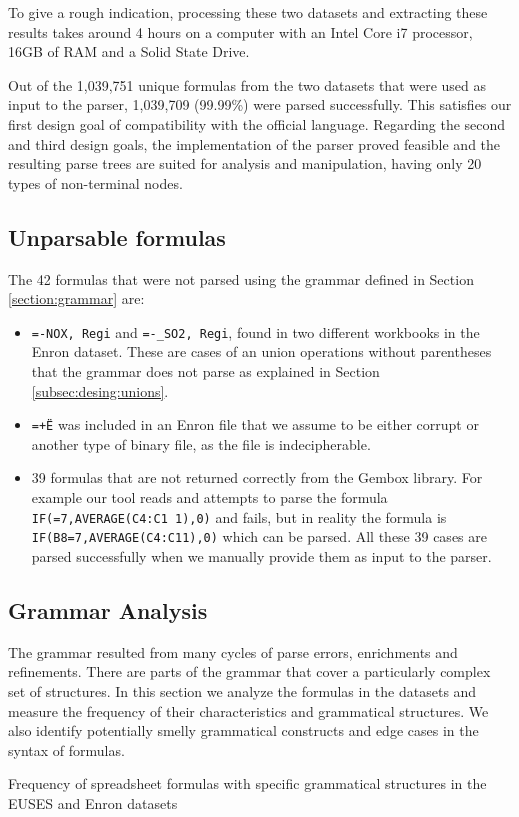 \documentclass[conference]{IEEEtran}
\begin{document}
To give a rough indication, processing these two datasets and extracting these results takes around 4 hours on a computer with an Intel Core i7 processor, 16GB of RAM and a Solid State Drive.

Out of the 1,039,751 unique formulas from the two datasets that were used as input to the parser, 1,039,709 (99.99\%) were parsed successfully. This satisfies our first design goal of compatibility with the official language. Regarding the second and third design goals, the implementation of the parser proved feasible and the resulting parse trees are suited for analysis and manipulation, having only 20 types of non-terminal nodes.

\subsection{Unparsable formulas}
\label{subsection:unparsableFormulas}
The 42 formulas that were not parsed using the grammar defined in Section \ref{section:grammar} are:

\begin{itemize}
	\item \texttt{=-NOX, Regi} and \texttt{=-_SO2, Regi}, found in two different workbooks in the Enron dataset. These are cases of an union operations without parentheses that the grammar does not parse as explained in Section \ref{subsec:desing:unions}.
	\item \texttt{=+Ë\textperthousand} was included in an Enron file that we assume to be either corrupt or another type of binary file, as the file is indecipherable.
	\item 39 formulas that are not returned correctly from the Gembox library. For example our tool reads and attempts to parse the formula \texttt{IF(=7,AVERAGE(C4:C1 1),0)} and fails, but in reality the formula is \texttt{IF(B8=7,AVERAGE(C4:C11),0)} which can be parsed. All these 39 cases are parsed successfully when we manually provide them as input to the parser.
\end{itemize}

\subsection{Grammar Analysis}
\label{subsection:grammarAnalysis}
The grammar resulted from many cycles of parse errors, enrichments and refinements. There are parts of the grammar that cover a particularly complex set of structures. In this section we analyze the formulas in the datasets and measure the frequency of their characteristics and grammatical structures. We also identify potentially smelly grammatical constructs and edge cases in the syntax of formulas.
\begin{table}
	\caption{Frequency of spreadsheet formulas with specific grammatical structures in the EUSES and Enron datasets}
	\label{table:occurences}
	\centering
	
\end{table}
\end{document}
